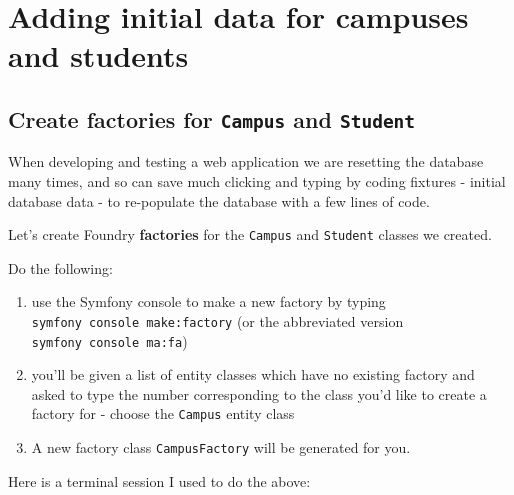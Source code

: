 \documentclass[a4paperpaper,openright]{book}
\begin{document}
\hypertarget{adding-initial-data-for-campuses-and-students}{%
\chapter{Adding initial data for campuses and
students}\label{adding-initial-data-for-campuses-and-students}}

\hypertarget{create-factories-for-campus-and-student}{%
\section{\texorpdfstring{Create factories for \texttt{Campus} and
\texttt{Student}}{Create factories for Campus and Student}}\label{create-factories-for-campus-and-student}}

When developing and testing a web application we are resetting the
database many times, and so can save much clicking and typing by coding
fixtures - initial database data - to re-populate the database with a
few lines of code.

Let's create Foundry \textbf{factories} for the \texttt{Campus} and
\texttt{Student} classes we created.

Do the following:

\begin{enumerate}
\def\labelenumi{\arabic{enumi}.}
\item
  use the Symfony console to make a new factory by typing
  \texttt{symfony\ console\ make:factory} (or the abbreviated version
  \texttt{symfony\ console\ ma:fa})
\item
  you'll be given a list of entity classes which have no existing
  factory and asked to type the number corresponding to the class you'd
  like to create a factory for - choose the \texttt{Campus} entity class
\item
  A new factory class \texttt{CampusFactory} will be generated for you.
\end{enumerate}

Here is a terminal session I used to do the above:
\end{document}
